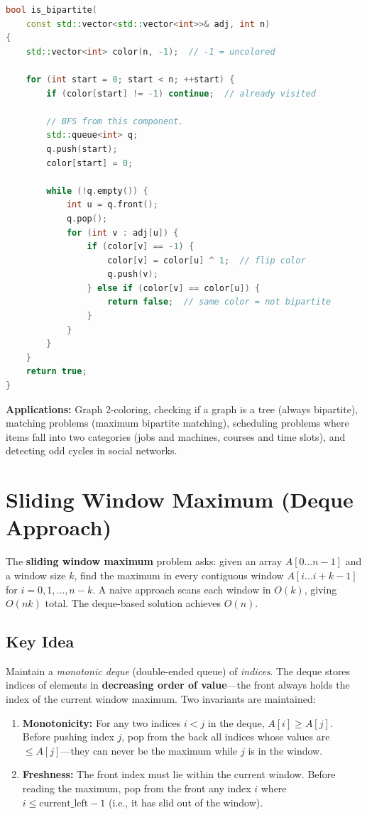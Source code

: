 \begin{lstlisting}[language=C++]
bool is_bipartite(
    const std::vector<std::vector<int>>& adj, int n)
{
    std::vector<int> color(n, -1);  // -1 = uncolored

    for (int start = 0; start < n; ++start) {
        if (color[start] != -1) continue;  // already visited

        // BFS from this component.
        std::queue<int> q;
        q.push(start);
        color[start] = 0;

        while (!q.empty()) {
            int u = q.front();
            q.pop();
            for (int v : adj[u]) {
                if (color[v] == -1) {
                    color[v] = color[u] ^ 1;  // flip color
                    q.push(v);
                } else if (color[v] == color[u]) {
                    return false;  // same color = not bipartite
                }
            }
        }
    }
    return true;
}
\end{lstlisting}

\textbf{Applications:} Graph 2-coloring, checking if a graph is a tree (always bipartite), matching problems (maximum bipartite matching), scheduling problems where items fall into two categories (jobs and machines, courses and time slots), and detecting odd cycles in social networks.

\section{Sliding Window Maximum (Deque Approach)}

The \textbf{sliding window maximum} problem asks: given an array $A[0 \ldots n-1]$ and a window size $k$, find the maximum in every contiguous window $A[i \ldots i+k-1]$ for $i = 0, 1, \ldots, n-k$. A naive approach scans each window in $O(k)$, giving $O(nk)$ total. The deque-based solution achieves $O(n)$.

\subsection{Key Idea}

Maintain a \emph{monotonic deque} (double-ended queue) of \emph{indices}. The deque stores indices of elements in \textbf{decreasing order of value}---the front always holds the index of the current window maximum. Two invariants are maintained:

\begin{enumerate}
\item \textbf{Monotonicity:} For any two indices $i < j$ in the deque, $A[i] \ge A[j]$. Before pushing index $j$, pop from the back all indices whose values are $\le A[j]$---they can never be the maximum while $j$ is in the window.
\item \textbf{Freshness:} The front index must lie within the current window. Before reading the maximum, pop from the front any index $i$ where $i \le \text{current\_left} - 1$ (i.e., it has slid out of the window).
\end{enumerate}

